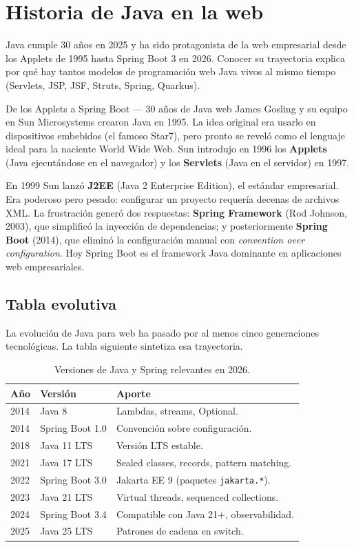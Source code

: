 \documentclass[11pt,a4paper,openany]{book}
\begin{document}
\section{Historia de Java en la web}

Java cumple 30 años en 2025 y ha sido protagonista de la web
empresarial desde los Applets de 1995 hasta Spring Boot 3 en 2026.
Conocer su trayectoria explica por qué hay tantos modelos de
programación web Java vivos al mismo tiempo (Servlets, JSP, JSF,
Struts, Spring, Quarkus).


\begin{cajahistoria}{De los Applets a Spring Boot --- 30 años de Java web}
James Gosling y su equipo en Sun Microsystems crearon Java en 1995.
La idea original era usarlo en dispositivos embebidos (el famoso
Star7), pero pronto se reveló como el lenguaje ideal para la naciente
World Wide Web. Sun introdujo en 1996 los \textbf{Applets} (Java
ejecutándose en el navegador) y los \textbf{Servlets} (Java en el
servidor) en 1997.

En 1999 Sun lanzó \textbf{J2EE} (Java 2 Enterprise Edition), el
estándar empresarial. Era poderoso pero pesado: configurar un proyecto
requería decenas de archivos XML. La frustración generó dos
respuestas: \textbf{Spring Framework} (Rod Johnson, 2003), que
simplificó la inyección de dependencias; y posteriormente
\textbf{Spring Boot} (2014), que eliminó la configuración manual con
\emph{convention over configuration}. Hoy Spring Boot es el framework
Java dominante en aplicaciones web empresariales.
\end{cajahistoria}

\subsection{Tabla evolutiva}

La evolución de Java para web ha pasado por al menos cinco
generaciones tecnológicas. La tabla siguiente sintetiza esa
trayectoria.


\begin{table}[htbp]
\centering
\caption{Versiones de Java y Spring relevantes en 2026.}
\footnotesize
\begin{tabularx}{\textwidth}{lXX}
\toprule
\textbf{Año} & \textbf{Versión} & \textbf{Aporte}\\
\midrule
2014 & Java 8       & Lambdas, streams, Optional.\\
2014 & Spring Boot 1.0 & Convención sobre configuración.\\
2018 & Java 11 LTS  & Versión LTS estable.\\
2021 & Java 17 LTS  & Sealed classes, records, pattern matching.\\
2022 & Spring Boot 3.0 & Jakarta EE 9 (paquetes \texttt{jakarta.*}).\\
2023 & Java 21 LTS  & Virtual threads, sequenced collections.\\
2024 & Spring Boot 3.4 & Compatible con Java 21+, observabilidad.\\
2025 & Java 25 LTS  & Patrones de cadena en switch.\\
\bottomrule
\end{tabularx}
\end{table}
\end{document}
